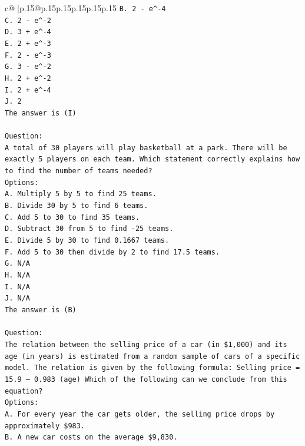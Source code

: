 \documentclass{article}
\begin{document}
{\begin{supertabular}{c@{$\;$}|p{.15\linewidth}@{}p{.15\linewidth}p{.15\linewidth}p{.15\linewidth}p{.15\linewidth}p{.15\linewidth}}
{{{\texttt{B. 2 {-} e\^{}{-}4} \\
\texttt{C. 2 {-} e\^{}{-}2} \\
\texttt{D. 3 + e\^{}{-}4} \\
\texttt{E. 2 + e\^{}{-}3} \\
\texttt{F. 2 {-} e\^{}{-}3} \\
\texttt{G. 3 {-} e\^{}{-}2} \\
\texttt{H. 2 + e\^{}{-}2} \\
\texttt{I. 2 + e\^{}{-}4} \\
\texttt{J. 2} \\
\texttt{The answer is (I)} \\
\\ 
\texttt{Question:} \\
\texttt{A total of 30 players will play basketball at a park. There will be exactly 5 players on each team. Which statement correctly explains how to find the number of teams needed?} \\
\texttt{Options:} \\
\texttt{A. Multiply 5 by 5 to find 25 teams.} \\
\texttt{B. Divide 30 by 5 to find 6 teams.} \\
\texttt{C. Add 5 to 30 to find 35 teams.} \\
\texttt{D. Subtract 30 from 5 to find {-}25 teams.} \\
\texttt{E. Divide 5 by 30 to find 0.1667 teams.} \\
\texttt{F. Add 5 to 30 then divide by 2 to find 17.5 teams.} \\
\texttt{G. N/A} \\
\texttt{H. N/A} \\
\texttt{I. N/A} \\
\texttt{J. N/A} \\
\texttt{The answer is (B)} \\
\\ 
\texttt{Question:} \\
\texttt{The relation between the selling price of a car (in \$1,000) and its age (in years) is estimated from a random sample of cars of a specific model. The relation is given by the following formula: Selling price = 15.9 – 0.983 (age) Which of the following can we conclude from this equation?} \\
\texttt{Options:} \\
\texttt{A. For every year the car gets older, the selling price drops by approximately \$983.} \\
\texttt{B. A new car costs on the average \$9,830.} \\
}}}
\end{supertabular}}
\end{document}
